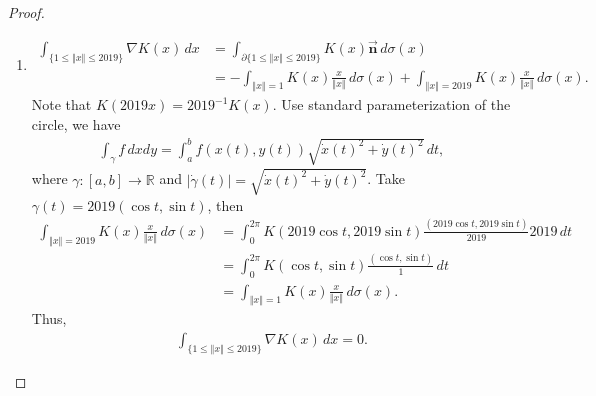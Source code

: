\documentclass[12pt,leqno]{amsart}
\theoremstyle{definition}
\begin{document}
\begin{proof}
\begin{enumerate}[label=(\alph*)]
    \item 
    \begin{align*}
        \int_{\{1\leq \Vert x\Vert\leq 2019\}} \nabla K(x)\, dx & = \int_{\partial \{1\leq \Vert x\Vert\leq 2019\}} K(x)\vec{\mathbf{n}}\, d\sigma(x) \\
        & = - \int_{\Vert x\Vert = 1} K(x) \frac{x}{\Vert x\Vert}\, d\sigma(x) + \int_{\Vert x\Vert = 2019} K(x) \frac{x}{\Vert x\Vert}\, d\sigma(x).
    \end{align*}
    Note that $K(2019 x) = 2019^{-1} K(x)$. Use standard parameterization of the circle, we have
    \begin{align*}
        \int_{\gamma} f\, dx dy = \int^b_a f(x(t), y(t)) \sqrt{\Dot{x}(t)^2 + \Dot{y}(t)^2} \, dt,
    \end{align*}
    where $\gamma: [a,b] \to \mathbb{R}$ and $|\Dot{\gamma}(t)| = \sqrt{\Dot{x}(t)^2 + \Dot{y}(t)^2}$. Take $\gamma(t) = 2019 (\cos t, \sin t)$, then 
    \begin{align*}
        \int_{\Vert x\Vert = 2019} K(x) \frac{x}{\Vert x\Vert}\, d\sigma(x) & = \int^{2\pi}_0 K(2019 \cos t, 2019 \sin t) \frac{(2019 \cos t, 2019 \sin t)}{2019} 2019 \, dt \\
        & = \int^{2\pi}_0 K(\cos t, \sin t) \frac{(\cos t, \sin t)}{1} \, dt \\
        & = \int_{\Vert x\Vert = 1} K(x) \frac{x}{\Vert x\Vert}\, d\sigma(x).
    \end{align*}
    Thus, 
    \begin{align*}
        \int_{\{1\leq \Vert x\Vert\leq 2019\}} \nabla K(x)\, dx = 0.
    \end{align*}
\end{enumerate}
\end{proof}


\medskip
\end{document}
